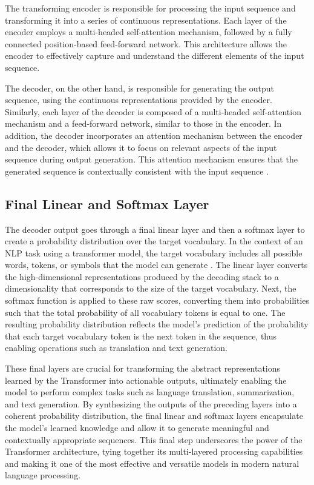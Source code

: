 The transforming encoder is responsible for processing the input sequence and transforming it into a series of continuous representations. Each layer of the encoder employs a multi-headed self-attention mechanism, followed by a fully connected position-based feed-forward network. This architecture allows the encoder to effectively capture and understand the different elements of the input sequence.

The decoder, on the other hand, is responsible for generating the output sequence, using the continuous representations provided by the encoder. Similarly, each layer of the decoder is composed of a multi-headed self-attention mechanism and a feed-forward network, similar to those in the encoder. In addition, the decoder incorporates an attention mechanism between the encoder and the decoder, which allows it to focus on relevant aspects of the input sequence during output generation. This attention mechanism ensures that the generated sequence is contextually consistent with the input sequence \cite{vaswani2017attention}.

\subsection{Final Linear and Softmax Layer}

The decoder output goes through a final linear layer and then a softmax layer to create a probability distribution over the target vocabulary. In the context of an NLP task using a transformer model, the target vocabulary includes all possible words, tokens, or symbols that the model can generate \cite{jozefowicz2016exploring}. The linear layer converts the high-dimensional representations produced by the decoding stack to a dimensionality that corresponds to the size of the target vocabulary. Next, the softmax function is applied to these raw scores, converting them into probabilities such that the total probability of all vocabulary tokens is equal to one. The resulting probability distribution reflects the model's prediction of the probability that each target vocabulary token is the next token in the sequence, thus enabling operations such as translation and text generation.

These final layers are crucial for transforming the abstract representations learned by the Transformer into actionable outputs, ultimately enabling the model to perform complex tasks such as language translation, summarization, and text generation. By synthesizing the outputs of the preceding layers into a coherent probability distribution, the final linear and softmax layers encapsulate the model's learned knowledge and allow it to generate meaningful and contextually appropriate sequences. This final step underscores the power of the Transformer architecture, tying together its multi-layered processing capabilities and making it one of the most effective and versatile models in modern natural language processing.

